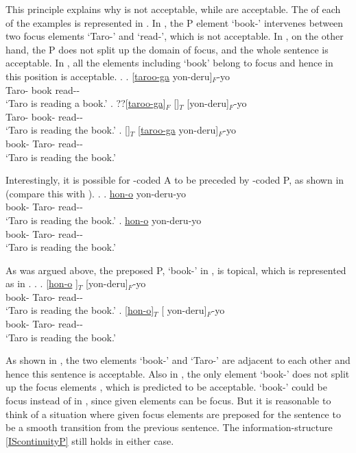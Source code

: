 This principle explains why \LLast[b] is not acceptable,
while \LLast[a,c] are acceptable.
The  of each of the examples \LLast is represented in \Next.
In \Next[b],
the  P element  `book-' intervenes between two focus elements  `Taro-' and  `read-', which is not acceptable.
In \Next[c], on the other hand,
the  P does not split up the domain of focus,
and the whole sentence is acceptable.
In \Next[a],
all the elements including  `book' belong to focus
and hence  in this position is acceptable.
%
\ex. \ag. [\ul{taroo-ga}  yon-deru]$_{F}$-yo \\
		Taro- book read-- \\
		`Taro is reading a book.'
	\bg. ??[\ul{taroo-ga}]$_{F}$ []$_{T}$ [yon-deru]$_{F}$-yo \\
		Taro- book- read-- \\
		`Taro is reading the book.'
	\bg. []$_{T}$ [\ul{taroo-ga} yon-deru]$_{F}$-yo \\
		book- Taro- read-- \\
		`Taro is reading the book.'

Interestingly,
it is possible for -coded A to be preceded by -coded P, as shown in \Next[a] (compare this with \Next[b]).
%
\ex.
\ag. \ul{hon-o}   yon-deru-yo \\
		book- Taro- read-- \\
		`Taro is reading the book.'
\bg. \ul{hon-o}  yon-deru-yo \\
		book- Taro- read-- \\
		`Taro is reading the book.'

As was argued above,
the preposed P,  `book-' in \Last,
is topical, which is represented as in \Next.
%
\ex.
\ag. [\ul{hon-o} ]$_{T}$  [yon-deru]$_{F}$-yo \\
		book- Taro- read-- \\
		`Taro is reading the book.'
\bg. [\ul{hon-o}]$_{T}$ [ yon-deru]$_{F}$-yo \\
		book- Taro- read-- \\
		`Taro is reading the book.'

As shown in \Last[a],
the two  elements  `book-' and  `Taro-' are adjacent to each other and hence this sentence is acceptable.
Also in \Last[b],
the only  element  `book-' does not split up the focus elements , which is predicted to be acceptable.
 `book-' could be focus instead of  in \LLast[b], since given elements can be focus.
But it is reasonable to think of a situation where given focus elements are preposed
for the sentence to be a smooth transition from the previous sentence.
The information-structure  \ref{IScontinuityP} still holds in either case.

